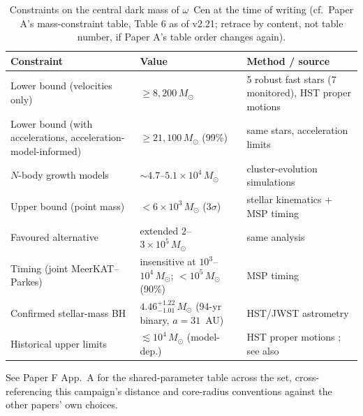 \documentclass[11pt]{article}
\newcommand{\msun}{\ensuremath{M_\odot}}
\begin{document}
\begin{table}[tbp]
\centering
\caption{Constraints on the central dark mass of $\omega$~Cen at the time of writing (cf.\ Paper A's mass-constraint table, Table 6 as of v2.21; retrace by content, not table number, if Paper A's table order changes again).}
\label{tab:mass}
\small
\begin{tabular}{p{4.1cm}p{3.4cm}p{6.2cm}}
\toprule
Constraint & Value & Method / source \\
\midrule
Lower bound (velocities only) & $\geq 8{,}200\,\msun$ & 5 robust fast stars (7 monitored), HST proper motions \citep{Haberle2024Nature} \\
Lower bound (with accelerations, acceleration-model-informed) & $\geq 21{,}100\,\msun$ (99\%) & same stars, acceleration limits \citep{Haberle2024Nature} \\
$N$-body growth models & $\sim 4.7$--$5.1\times10^{4}\,\msun$ & cluster-evolution simulations \citep{GonzalezPrieto2025} \\
Upper bound (point mass) & $< 6\times10^{3}\,\msun$ ($3\sigma$) & stellar kinematics + MSP timing \citep{BanaresHernandez2025} \\
Favoured alternative & extended $2$--$3\times10^{5}\,\msun$ & same analysis \citep{BanaresHernandez2025} \\
Timing (joint MeerKAT--Parkes) & insensitive at $10^{3}$--$10^{4}\,\msun$; $< 10^{5}\,\msun$ (90\%) & MSP timing \citep{ColomiBernadich2026} \\
Confirmed stellar-mass BH & $4.46^{+1.22}_{-1.01}\,\msun$ (94-yr binary, $a = 31$~AU) & HST/JWST astrometry \citep{Whitaker2026BH2} \\
Historical upper limits & $\lesssim 10^{4}\,\msun$ (model-dep.) & HST proper motions \citep{vanderMarelAnderson2010}; see also \citet{Noyola2008,Zocchi2019} \\
\bottomrule
\end{tabular}
\end{table}

See Paper F App.~A for the shared-parameter table across the set, cross-referencing this campaign's distance and core-radius conventions against the other papers' own choices.
\end{document}
